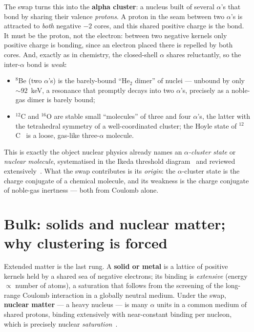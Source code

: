 \documentclass[11pt]{article}
\begin{document}
The swap turns this into the \textbf{alpha cluster}: a nucleus built of several $\alpha$'s that bond
by sharing their valence \emph{protons}. A proton in the seam between two $\alpha$'s is attracted to
\emph{both} negative $-2$ cores, and this shared positive charge is the bond. It must be the proton,
not the electron: between two negative kernels only positive charge is bonding, since an electron
placed there is repelled by both cores. And, exactly as in chemistry, the closed-shell $\alpha$ shares
reluctantly, so the inter-$\alpha$ bond is \emph{weak}:
\begin{itemize}\setlength{\itemsep}{2pt}
\item $^8$Be (two $\alpha$'s) is the barely-bound ``He$_2$ dimer'' of nuclei --- unbound by only
$\sim\!92$~keV, a resonance that promptly decays into two $\alpha$'s, precisely as a noble-gas dimer is
barely bound;
\item $^{12}$C and $^{16}$O are stable small ``molecules'' of three and four $\alpha$'s, the latter
with the tetrahedral symmetry of a well-coordinated cluster; the Hoyle state of
$^{12}$C~\cite{Hoyle,THSR} is a loose, gas-like three-$\alpha$ molecule.
\end{itemize}
This is exactly the object nuclear physics already names an \emph{$\alpha$-cluster state} or
\emph{nuclear molecule}, systematised in the Ikeda threshold diagram~\cite{Ikeda} and reviewed
extensively~\cite{FreerRPP,FreerRMP,vonOertzen}. What the swap contributes is its \emph{origin}: the
$\alpha$-cluster state is the charge conjugate of a chemical molecule, and its weakness is the
charge conjugate of noble-gas inertness --- both from Coulomb alone.

\section{Bulk: solids and nuclear matter; why clustering is forced}

Extended matter is the last rung. A \textbf{solid or metal} is a lattice of positive kernels held by a
shared sea of negative electrons; its binding is \emph{extensive} (energy $\propto$ number of atoms),
a saturation that follows from the screening of the long-range Coulomb interaction in a globally
neutral medium. Under the swap, \textbf{nuclear matter} --- a heavy nucleus --- is many $\alpha$ units
in a common medium of shared protons, binding extensively with near-constant binding per nucleon,
which is precisely nuclear \emph{saturation}~\cite{BetheWeizsacker}.
\end{document}
